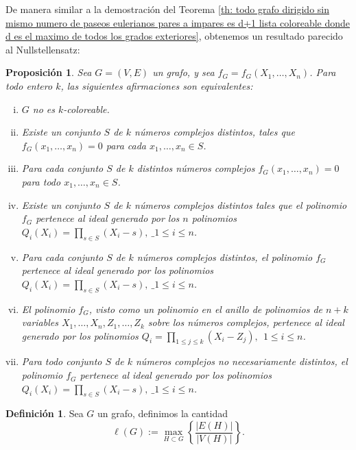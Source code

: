 \documentclass[12pt]{report}
\theoremstyle{plain}
\newtheorem{proposition}[theorem]{Proposición}
\theoremstyle{definition}
\newtheorem{definition}[theorem]{Definición}
\newcommand{\abs}[1]{\left \vert #1 \right \vert}
\begin{document}
De manera similar a la demostración del Teorema \ref{th: todo grafo dirigido sin mismo numero de paseos eulerianos pares a impares es d+1 lista coloreable donde d es el maximo de todos los grados exteriores}, obtenemos un resultado parecido al Nullstellensatz:

\begin{proposition}
Sea $G = (V,E)$ un grafo, y sea $f_G = f_{G} (X_1, \ldots, X_n)$. Para todo entero $k$, las siguientes afirmaciones son equivalentes:
\begin{enumerate}[(i)]
\item $G$ no es $k$-coloreable.
\item Existe un conjunto $S$ de $k$ números complejos distintos, tales que $f_G (x_1, \ldots, x_n) = 0$ para cada $x_1, \ldots,x_n \in S$.
\item Para cada conjunto $S$ de $k$ distintos números complejos $f_G(x_1, \ldots, x_n) = 0$ para todo $x_1, \ldots, x_n \in S$.
\item Existe un conjunto $S$ de $k$ números complejos distintos tales que el polinomio $f_G$ pertenece al ideal generado por los $n$ polinomios $Q_i (X_i) = \prod_{s \in S} (X_i - s), \: \_ 1 \leq i \leq n$.
\item Para cada conjunto $S$ de $k$ números complejos distintos, el polinomio $f_G$ pertenece al ideal generado por los polinomios $Q_i (X_i) = \prod_{s \in S} (X_i - s), \: \_ 1 \leq i \leq n$.
\item El polinomio $f_G$, visto como un polinomio en el anillo de polinomios de $n+k$ variables $X_1, \ldots, X_n, Z_1, \ldots,Z_k$ sobre los números complejos, pertenece al ideal generado por los polinomios $Q_i = \prod_{1 \leq j \leq k} (X_i - Z_j), \: \: 1 \leq i \leq n$.
\item Para todo conjunto $S$ de $k$ números complejos no necesariamente distintos, el polinomio $f_G$ pertenece al ideal generado por los polinomios $Q_i (X_i) = \prod_{s \in S} (X_i - s), \: \_ 1 \leq i \leq n$.
\end{enumerate}
\end{proposition}


\bigskip

\begin{definition}
Sea $G$ un grafo, definimos la cantidad
\[
    \ell (G) := \max_{H \subset G} \left \{ \frac{\abs {E (H)}}{\abs{V(H)}} \right \}.
\]
\end{definition}
\end{document}
